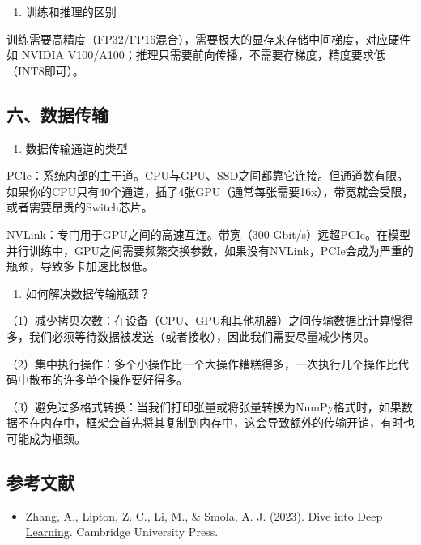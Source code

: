 \begin{enumerate}
\def\labelenumi{\arabic{enumi}.}
\setcounter{enumi}{2}
\tightlist
\item
  训练和推理的区别
\end{enumerate}

训练需要高精度（FP32/FP16混合），需要极大的显存来存储中间梯度，对应硬件如 NVIDIA V100/A100；推理只需要前向传播，不需要存梯度，精度要求低（INT8即可）。

\hypertarget{ux516dux6570ux636eux4f20ux8f93}{%
\subsection{六、数据传输}\label{ux516dux6570ux636eux4f20ux8f93}}

\begin{enumerate}
\def\labelenumi{\arabic{enumi}.}
\tightlist
\item
  数据传输通道的类型
\end{enumerate}

PCIe：系统内部的主干道。CPU与GPU、SSD之间都靠它连接。但通道数有限。如果你的CPU只有40个通道，插了4张GPU（通常每张需要16x），带宽就会受限，或者需要昂贵的Switch芯片。

NVLink：专门用于GPU之间的高速互连。带宽（300 Gbit/s）远超PCIe。在模型并行训练中，GPU之间需要频繁交换参数，如果没有NVLink，PCIe会成为严重的瓶颈，导致多卡加速比极低。

\begin{enumerate}
\def\labelenumi{\arabic{enumi}.}
\setcounter{enumi}{1}
\tightlist
\item
  如何解决数据传输瓶颈？
\end{enumerate}

（1）减少拷贝次数：在设备（CPU、GPU和其他机器）之间传输数据比计算慢得多，我们必须等待数据被发送（或者接收），因此我们需要尽量减少拷贝。

（2）集中执行操作：多个小操作比一个大操作糟糕得多，一次执行几个操作比代码中散布的许多单个操作要好得多。

（3）避免过多格式转换：当我们打印张量或将张量转换为NumPy格式时，如果数据不在内存中，框架会首先将其复制到内存中，这会导致额外的传输开销，有时也可能成为瓶颈。

\FloatBarrier
{}
\hypertarget{ux53c2ux8003ux6587ux732e-34}{%
\subsection{参考文献}\label{ux53c2ux8003ux6587ux732e-34}}

\vspace{0.25em}
\begin{itemize}
\tightlist
\item
  Zhang, A., Lipton, Z. C., Li, M., \& Smola, A. J. (2023). \href{https://D2L.ai}{Dive into Deep Learning}. Cambridge University Press.
\end{itemize}

\clearpage

